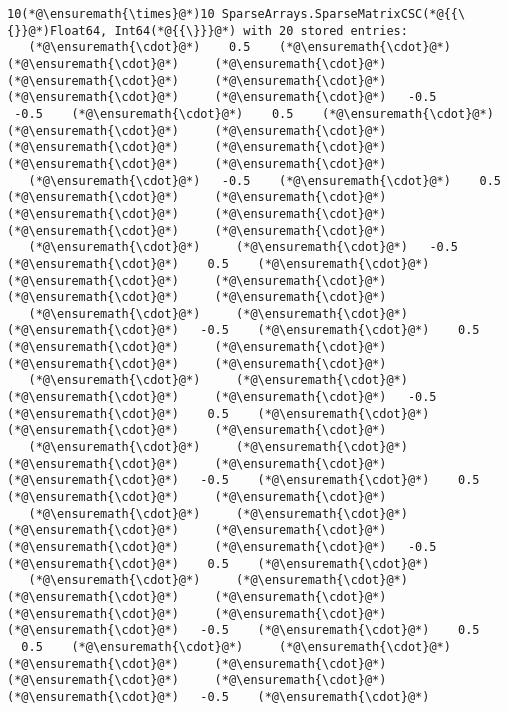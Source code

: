 \documentclass[12pt,a4paper]{article}
\begin{document}
\begin{lstlisting}
10(*@\ensuremath{\times}@*)10 SparseArrays.SparseMatrixCSC(*@{{\{}}@*)Float64, Int64(*@{{\}}}@*) with 20 stored entries:
   (*@\ensuremath{\cdot}@*)    0.5    (*@\ensuremath{\cdot}@*)     (*@\ensuremath{\cdot}@*)     (*@\ensuremath{\cdot}@*)     (*@\ensuremath{\cdot}@*)     (*@\ensuremath{\cdot}@*)     (*@\ensuremath{\cdot}@*)     (*@\ensuremath{\cdot}@*)   -0.5
 -0.5    (*@\ensuremath{\cdot}@*)    0.5    (*@\ensuremath{\cdot}@*)     (*@\ensuremath{\cdot}@*)     (*@\ensuremath{\cdot}@*)     (*@\ensuremath{\cdot}@*)     (*@\ensuremath{\cdot}@*)     (*@\ensuremath{\cdot}@*)     (*@\ensuremath{\cdot}@*) 
   (*@\ensuremath{\cdot}@*)   -0.5    (*@\ensuremath{\cdot}@*)    0.5    (*@\ensuremath{\cdot}@*)     (*@\ensuremath{\cdot}@*)     (*@\ensuremath{\cdot}@*)     (*@\ensuremath{\cdot}@*)     (*@\ensuremath{\cdot}@*)     (*@\ensuremath{\cdot}@*) 
   (*@\ensuremath{\cdot}@*)     (*@\ensuremath{\cdot}@*)   -0.5    (*@\ensuremath{\cdot}@*)    0.5    (*@\ensuremath{\cdot}@*)     (*@\ensuremath{\cdot}@*)     (*@\ensuremath{\cdot}@*)     (*@\ensuremath{\cdot}@*)     (*@\ensuremath{\cdot}@*) 
   (*@\ensuremath{\cdot}@*)     (*@\ensuremath{\cdot}@*)     (*@\ensuremath{\cdot}@*)   -0.5    (*@\ensuremath{\cdot}@*)    0.5    (*@\ensuremath{\cdot}@*)     (*@\ensuremath{\cdot}@*)     (*@\ensuremath{\cdot}@*)     (*@\ensuremath{\cdot}@*) 
   (*@\ensuremath{\cdot}@*)     (*@\ensuremath{\cdot}@*)     (*@\ensuremath{\cdot}@*)     (*@\ensuremath{\cdot}@*)   -0.5    (*@\ensuremath{\cdot}@*)    0.5    (*@\ensuremath{\cdot}@*)     (*@\ensuremath{\cdot}@*)     (*@\ensuremath{\cdot}@*) 
   (*@\ensuremath{\cdot}@*)     (*@\ensuremath{\cdot}@*)     (*@\ensuremath{\cdot}@*)     (*@\ensuremath{\cdot}@*)     (*@\ensuremath{\cdot}@*)   -0.5    (*@\ensuremath{\cdot}@*)    0.5    (*@\ensuremath{\cdot}@*)     (*@\ensuremath{\cdot}@*) 
   (*@\ensuremath{\cdot}@*)     (*@\ensuremath{\cdot}@*)     (*@\ensuremath{\cdot}@*)     (*@\ensuremath{\cdot}@*)     (*@\ensuremath{\cdot}@*)     (*@\ensuremath{\cdot}@*)   -0.5    (*@\ensuremath{\cdot}@*)    0.5    (*@\ensuremath{\cdot}@*) 
   (*@\ensuremath{\cdot}@*)     (*@\ensuremath{\cdot}@*)     (*@\ensuremath{\cdot}@*)     (*@\ensuremath{\cdot}@*)     (*@\ensuremath{\cdot}@*)     (*@\ensuremath{\cdot}@*)     (*@\ensuremath{\cdot}@*)   -0.5    (*@\ensuremath{\cdot}@*)    0.5
  0.5    (*@\ensuremath{\cdot}@*)     (*@\ensuremath{\cdot}@*)     (*@\ensuremath{\cdot}@*)     (*@\ensuremath{\cdot}@*)     (*@\ensuremath{\cdot}@*)     (*@\ensuremath{\cdot}@*)     (*@\ensuremath{\cdot}@*)   -0.5    (*@\ensuremath{\cdot}@*)
\end{lstlisting}
\end{document}
